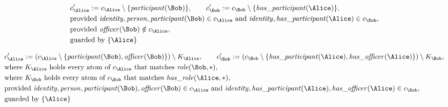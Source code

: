 \begin{align*}
&
c'_
{
\Alice
}
 := 
c_
{
\Alice
}
 \setminus 
\{
\mathit{\detokenize{
participant
}}
(
\Bob
)
\}
, \qquad 
c'_
{
\Bob
}
 := 
c_
{
\Bob
}
 \setminus 
\{
\mathit{\detokenize{
has_participant
}}
(
\Alice
)
\}
,\\
&
\text{provided } 
\mathit{\detokenize{
identity
}}
,
\mathit{\detokenize{
person
}}
,
\mathit{\detokenize{
participant
}}
(
\Bob
)
 \in c_
{
\Alice
}
 \text{ and } 
\mathit{\detokenize{
identity
}}
,
\mathit{\detokenize{
has_participant
}}
(
\Alice
)
 \in c_
{
\Bob
}
,\\
&
\text{provided } 
\mathit{\detokenize{
officer
}}
(
\Bob
)
 \notin c_
{
\Alice
}
,\\
&
\text{guarded by } \{
\Alice
\}
\end{align*}

\begin{align*}
&
c'_
{
\Alice
}
 := 
(c_
{
\Alice
}
 \setminus 
\{
\mathit{\detokenize{
participant
}}
(
\Bob
)
,
\mathit{\detokenize{
officer
}}
(
\Bob
)
\}
) \setminus K_
{
\Alice
}
, \qquad 
c'_
{
\Bob
}
 := 
(c_
{
\Bob
}
 \setminus 
\{
\mathit{\detokenize{
has_participant
}}
(
\Alice
)
,
\mathit{\detokenize{
has_officer
}}
(
\Alice
)
\}
) \setminus K_
{
\Bob
}
,\\
&
\text{where } K_
{
\Alice
}
 \text{ holds every atom of } c_
{
\Alice
}
 \text{ that matches } 
\mathit{\detokenize{
role
}}
(
\Bob
,
\ast
)
,\\
&
\text{where } K_
{
\Bob
}
 \text{ holds every atom of } c_
{
\Bob
}
 \text{ that matches } 
\mathit{\detokenize{
has_role
}}
(
\Alice
,
\ast
)
,\\
&
\text{provided } 
\mathit{\detokenize{
identity
}}
,
\mathit{\detokenize{
person
}}
,
\mathit{\detokenize{
participant
}}
(
\Bob
)
,
\mathit{\detokenize{
officer
}}
(
\Bob
)
 \in c_
{
\Alice
}
 \text{ and } 
\mathit{\detokenize{
identity
}}
,
\mathit{\detokenize{
has_participant
}}
(
\Alice
)
,
\mathit{\detokenize{
has_officer
}}
(
\Alice
)
 \in c_
{
\Bob
}
,\\
&
\text{guarded by } \{
\Alice
\}
\end{align*}

